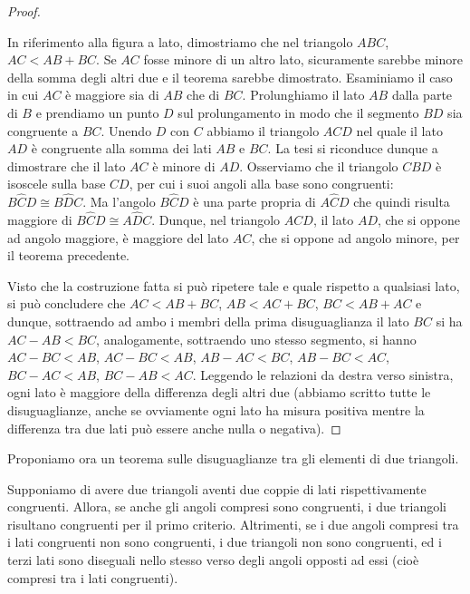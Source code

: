  \begin{proof}
~

\noindent\begin{minipage}{0.7\textwidth}\parindent15pt 
    In riferimento alla figura a lato, dimostriamo che nel triangolo 
    $ABC$, $AC < AB + BC$. Se $AC$ fosse minore di un altro lato, 
    sicuramente sarebbe minore della somma degli altri due e il teorema 
    sarebbe dimostrato. Esaminiamo il caso in cui $AC$ è maggiore sia di 
    $AB$ che di $BC$. Prolunghiamo il lato $AB$ dalla parte di $B$ e 
    prendiamo un punto $D$ sul prolungamento in modo che il segmento $BD$ 
    sia congruente a $BC$. Unendo $D$ con $C$ abbiamo il triangolo $ACD$ 
    nel quale il lato $AD$ è congruente alla somma dei lati $AB$ e $BC$. 
    La tesi si riconduce dunque a dimostrare che il lato $AC$ è minore di 
    $AD$. Osserviamo che il triangolo $CBD$ è isoscele sulla base $CD$, 
    per cui i suoi angoli alla base sono congruenti: $B\widehat{C}D\cong 
    B\widehat{D}C$. Ma l'angolo $B\widehat{C}D$ è una parte propria di 
    $A\widehat{C}D$ che quindi risulta maggiore di $B\widehat{C}D\cong 
    A\widehat{D}C$. Dunque, nel triangolo $ACD$, il lato $AD$, che si 
    oppone ad angolo maggiore, è maggiore del lato $AC$, che si oppone ad 
    angolo minore, per il teorema precedente.
\end{minipage}\hfil
\begin{minipage}{0.3\textwidth}
  \centering
\end{minipage}
    
    Visto che la costruzione fatta si può ripetere tale e quale rispetto 
    a qualsiasi lato, si può concludere che $AC<AB+BC$, $AB<AC+BC$, 
    $BC<AB+AC$ e dunque, sottraendo ad ambo i membri della prima 
    disuguaglianza il lato $BC$ si ha $AC-AB<BC$, analogamente, 
    sottraendo uno stesso segmento, si hanno $AC-BC<AB$, $AC-BC<AB$, 
    $AB-AC<BC$, $AB-BC<AC$, $BC-AC<AB$, $BC-AB<AC$. Leggendo le relazioni 
    da destra verso sinistra, ogni lato è maggiore della differenza degli 
    altri due (abbiamo scritto tutte le disuguaglianze, anche se 
    ovviamente ogni lato ha misura positiva mentre la differenza tra due 
    lati può essere anche nulla o negativa).
  \end{proof}

Proponiamo ora un teorema sulle disuguaglianze tra gli elementi di 
due triangoli.

Supponiamo di avere due triangoli aventi due coppie di lati 
rispettivamente congruenti. Allora, se anche gli angoli compresi sono 
congruenti, i due triangoli risultano congruenti per il primo 
criterio. Altrimenti, se i due angoli compresi tra i lati congruenti 
non sono congruenti, i due triangoli non sono congruenti, ed i terzi 
lati sono diseguali nello stesso verso degli angoli opposti ad essi 
(cioè compresi tra i lati congruenti).

